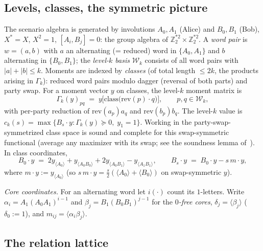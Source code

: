 \documentclass[11pt]{article}
\newcommand{\la}{\langle}
\newcommand{\ra}{\rangle}
\begin{document}
\subsection{Levels, classes, the symmetric picture}

The scenario algebra is generated by involutions $A_0,A_1$ (Alice) and
$B_0,B_1$ (Bob), $X^\ast=X$, $X^2=1$, $[A_i,B_j]=0$: the group algebra of
$\mathbb Z_2^{\ast2}\times\mathbb Z_2^{\ast2}$. A \emph{word pair} is
$w=(a,b)$ with $a$ an alternating (= reduced) word in $\{A_0,A_1\}$ and $b$
alternating in $\{B_0,B_1\}$; the \emph{level-$k$ basis} $\mathcal W_k$
consists of all word pairs with $|a|+|b|\le k$. Moments are indexed by
\emph{classes} (of total length $\le2k$, the products arising in $\Gamma_k$): reduced word pairs modulo dagger (reversal of both parts)
and party swap. For a moment vector $y$ on classes, the level-$k$ moment
matrix is
\[
\Gamma_k(y)_{pq}\;=\;y\bigl[\mathrm{class}\bigl(\mathrm{rev}(p)\cdot
q\bigr)\bigr],\qquad p,q\in\mathcal W_k,
\]
with per-party reduction of $\mathrm{rev}(a_p)a_q$ and
$\mathrm{rev}(b_p)b_q$. The level-$k$ value is
$c_k(s)=\max\{B_s\cdot y:\Gamma_k(y)\succeq0,\;y_1=1\}$. Working in the
party-swap-symmetrized class space is sound and complete for this
swap-symmetric functional (average any maximizer with its swap; see the
soundness lemma of~\cite{sep}). In class coordinates,
\[
B_0\cdot y\;=\;2y_{\la A_0\ra}+y_{\la A_0B_0\ra}+2y_{\la A_0B_1\ra}
-y_{\la A_1B_1\ra},\qquad
B_s\cdot y\;=\;B_0\cdot y-s\,m\cdot y,
\]
where $m\cdot y:=y_{\la A_0\ra}$ (so $s\,m\cdot y=\tfrac
s2(\la A_0\ra+\la B_0\ra)$ on swap-symmetric $y$).

\emph{Core coordinates.} For an alternating word let $i(\cdot)$ count its
$1$-letters. Write $\alpha_i=A_1(A_0A_1)^{i-1}$ and
$\beta_j=B_1(B_0B_1)^{j-1}$ for the \emph{$0$-free cores},
$\delta_j=\la\beta_j\ra$ ($\delta_0:=1$), and
$m_{ij}=\la\alpha_i\beta_j\ra$.

\subsection{The relation lattice}\label{sec:lattice}
\end{document}

